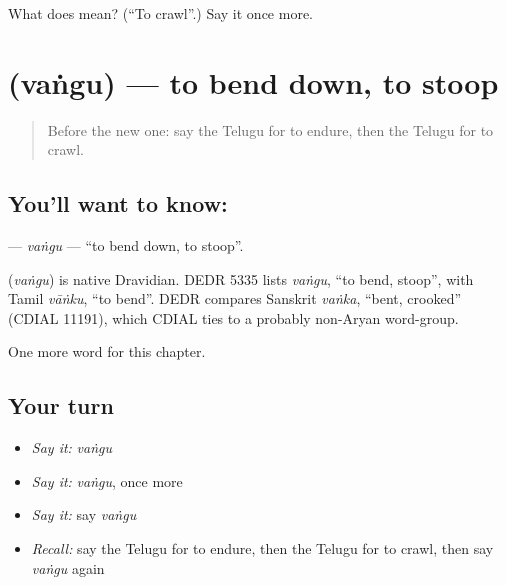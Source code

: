 \begin{tcolorbox}[breakable,colback=teal!4,colframe=teal!35!black,title={Before you move on}]
What does  mean? (\textquotedblleft{}To crawl\textquotedblright{}.) Say it once more.
\end{tcolorbox}
\section[\texorpdfstring{\te{వంగు} (vaṅgu)}{వంగు (vaṅgu)}]{ (vaṅgu) — to bend down, to stoop}

\label{lesson:TE-C249-vangu}



\begin{quote}
Before the new one: say the Telugu for to endure, then the Telugu for to crawl.
\end{quote}

\subsection*{You'll want to know: }
\textbf{} — \emph{vaṅgu} — \textquotedblleft{}to bend down, to stoop\textquotedblright{}.

\begin{cousinweb}
\textbf{} (\emph{vaṅgu}) is native Dravidian. DEDR 5335 lists \emph{vaṅgu}, \textquotedblleft{}to bend, stoop\textquotedblright{}, with Tamil \emph{vāṅku}, \textquotedblleft{}to bend\textquotedblright{}. DEDR compares Sanskrit \emph{vaṅka}, \textquotedblleft{}bent, crooked\textquotedblright{} (CDIAL 11191), which CDIAL ties to a probably non-Aryan word-group.
\end{cousinweb}

\begin{grammarlens}[title={What you've built}]
One more word for this chapter.
\end{grammarlens}

\subsection*{Your turn}
\begin{itemize}
\raggedright
  \item \emph{Say it:} \emph{vaṅgu}
  \item \emph{Say it:} \emph{vaṅgu}, once more
  \item \emph{Say it:} say \emph{vaṅgu}
  \item \emph{Recall:} say the Telugu for to endure, then the Telugu for to crawl, then say \emph{vaṅgu} again
\end{itemize}

